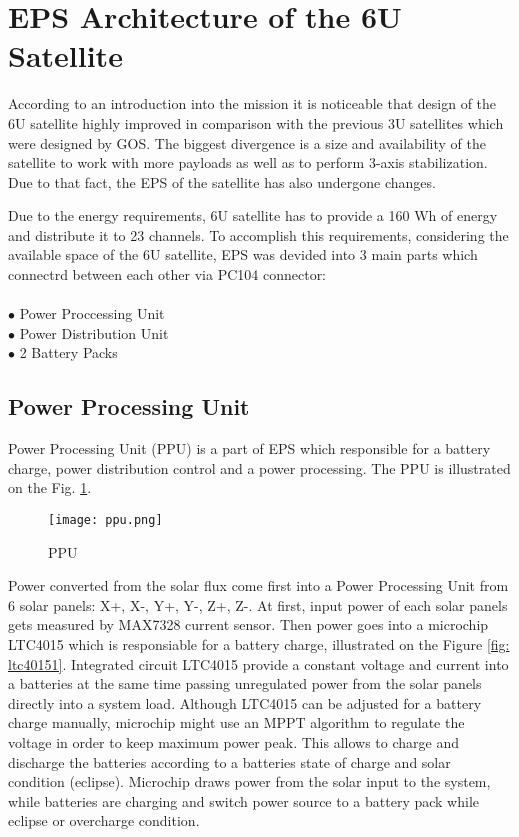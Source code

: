  
  \section{EPS Architecture of the 6U Satellite}
  According to an introduction into the mission it is noticeable that design of the 6U satellite highly improved in comparison with the previous 3U satellites which were designed by GOS. The biggest divergence is a size and availability of the satellite to work with more payloads as well as to perform 3-axis stabilization. Due to that fact, the EPS of the satellite has also undergone changes.
  
  Due to the energy requirements, 6U satellite has to provide a 160 Wh of energy and  distribute it to 23 channels. To accomplish this requirements, considering the available space of the 6U satellite, EPS was devided into 3 main parts which connectrd between each other via PC104 connector:\\ \\
  $\bullet$ Power Proccessing Unit\\
  $\bullet$ Power Distribution Unit\\
  $\bullet$ 2 Battery Packs\\
  
   \subsection{Power Processing Unit}
   Power Processing Unit (PPU) is a part of EPS which responsible for a battery charge, power distribution control and a power processing. The PPU is illustrated on the Fig. \ref{fig: psu122}.
   
   \begin{figure}[h]
   	\centering
   	\texttt{[image: ppu.png]}
   	\caption{PPU}
   	\label{fig: psu122}
   \end{figure}
   
   Power converted from the solar flux come first into a Power Processing Unit from 6 solar panels: X+, X-, Y+, Y-, Z+, Z-. At first, input power of each solar panels gets measured by MAX7328 current sensor. Then power goes into a microchip LTC4015 which is responsiable for a battery charge, illustrated on the Figure \ref{fig: ltc40151}. Integrated circuit LTC4015 provide a constant voltage and current into a batteries at the same time passing unregulated power from the solar panels directly into a system load. Although LTC4015 can be adjusted for a battery charge manually, microchip might use an MPPT algorithm to regulate the voltage in order to keep maximum power peak. This allows to charge and discharge the batteries according to a batteries state of charge and solar condition (eclipse). Microchip draws power from the solar input to the system, while batteries are charging and switch power source to a battery pack while eclipse or overcharge condition.
   

